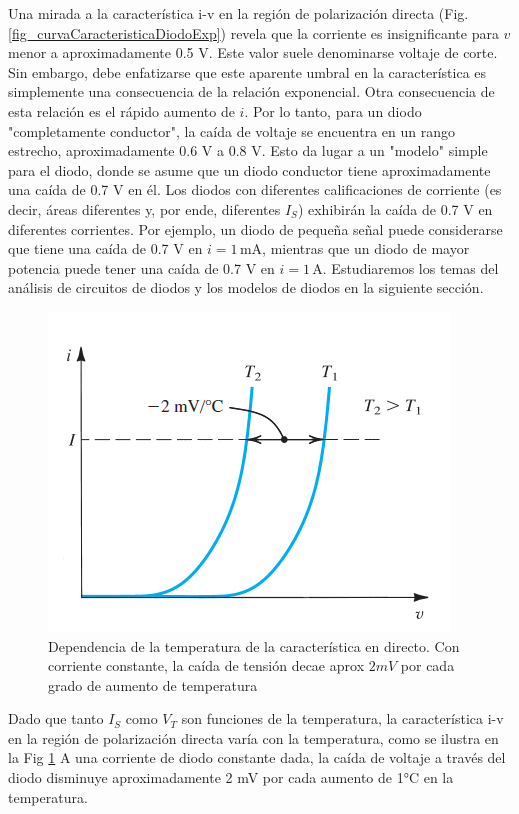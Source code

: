 Una mirada a la característica i-v en la región de polarización directa (Fig. \ref{fig_curvaCaracteristicaDiodoExp}) revela que la corriente es insignificante para \( v \) menor a aproximadamente 0.5 V. Este valor suele denominarse voltaje de corte. Sin embargo, debe enfatizarse que este aparente umbral en la característica es simplemente una consecuencia de la relación exponencial. Otra consecuencia de esta relación es el rápido aumento de \( i \). Por lo tanto, para un diodo "completamente conductor", la caída de voltaje se encuentra en un rango estrecho, aproximadamente 0.6 V a 0.8 V. Esto da lugar a un "modelo" simple para el diodo, donde se asume que un diodo conductor tiene aproximadamente una caída de 0.7 V en él. Los diodos con diferentes calificaciones de corriente (es decir, áreas diferentes y, por ende, diferentes \( I_S \)) exhibirán la caída de 0.7 V en diferentes corrientes. Por ejemplo, un diodo de pequeña señal puede considerarse que tiene una caída de 0.7 V en \( i = 1 \, \text{mA} \), mientras que un diodo de mayor potencia puede tener una caída de 0.7 V en \( i = 1\, \text{A} \). Estudiaremos los temas del análisis de circuitos de diodos y los modelos de diodos en la siguiente sección.

\begin{figure}[H]
    \centering
    \includegraphics[scale=0.6]{Electronica/diodo_f5.png}
    \caption{Dependencia de la temperatura de la característica en directo. Con corriente constante, la caída de tensión decae aprox $2mV$ por cada grado de aumento de temperatura}
    \label{fig_dependenciaDiodoaTemperatura}
\end{figure}


Dado que tanto \( I_S \) como \( V_T \) son funciones de la temperatura, la característica i-v en la región de polarización directa varía con la temperatura, como se ilustra en la Fig \ref{fig_dependenciaDiodoaTemperatura} A una corriente de diodo constante dada, la caída de voltaje a través del diodo disminuye aproximadamente 2 mV por cada aumento de 1°C en la temperatura.

